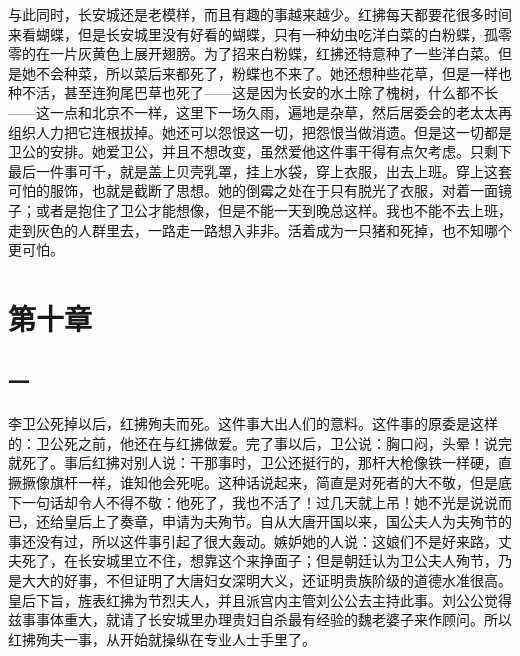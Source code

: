 与此同时，长安城还是老模样，而且有趣的事越来越少。红拂每天都要花很多时间来看蝴蝶，但是长安城里没有好看的蝴蝶，只有一种幼虫吃洋白菜的白粉蝶，孤零零的在一片灰黄色上展开翅膀。为了招来白粉蝶，红拂还特意种了一些洋白菜。但是她不会种菜，所以菜后来都死了，粉蝶也不来了。她还想种些花草，但是一样也种不活，甚至连狗尾巴草也死了——这是因为长安的水土除了槐树，什么都不长——这一点和北京不一样，这里下一场久雨，遍地是杂草，然后居委会的老太太再组织人力把它连根拔掉。她还可以怨恨这一切，把怨恨当做消遗。但是这一切都是卫公的安排。她爱卫公，并且不想改变，虽然爱他这件事干得有点欠考虑。只剩下最后一件事可千，就是盖上贝壳乳罩，挂上水袋，穿上衣服，出去上班。穿上这套可怕的服饰，也就是截断了思想。她的倒霉之处在于只有脱光了衣服，对着一面镜子；或者是抱住了卫公才能想像，但是不能一天到晚总这样。我也不能不去上班，走到灰色的人群里去，一路走一路想入非非。活着成为一只猪和死掉，也不知哪个更可怕。

\section{第十章}

\subsection{一}

李卫公死掉以后，红拂殉夫而死。这件事大出人们的意料。这件事的原委是这样的：卫公死之前，他还在与红拂做爱。完了事以后，卫公说：胸口闷，头晕！说完就死了。事后红拂对别人说：干那事时，卫公还挺行的，那杆大枪像铁一样硬，直撅撅像旗杆一样，谁知他会死呢。这种话说起来，简直是对死者的大不敬，但是底下一句话却令人不得不敬：他死了，我也不活了！过几天就上吊！她不光是说说而已，还给皇后上了奏章，申请为夫殉节。自从大唐开国以来，国公夫人为夫殉节的事还没有过，所以这件事引起了很大轰动。嫉妒她的人说：这娘们不是好来路，丈夫死了，在长安城里立不住，想靠这个来挣面子；但是朝廷认为卫公夫人殉节，乃是大大的好事，不但证明了大唐妇女深明大义，还证明贵族阶级的道德水准很高。皇后下旨，旌表红拂为节烈夫人，并且派宫内主管刘公公去主持此事。刘公公觉得兹事事体重大，就请了长安城里办理贵妇自杀最有经验的魏老婆子来作顾问。所以红拂殉夫一事，从开始就操纵在专业人士手里了。 

